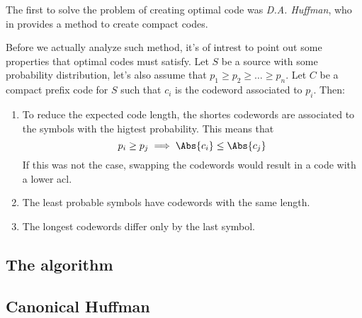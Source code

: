 \documentclass{subfiles}
\begin{document}
\label{Sec:2}
    The first to solve the problem of creating optimal code was \emph{D.A. Huffman},
       who in \cite{huffman1952} provides a method to create compact codes.

        Before we actually analyze such method, 
            it's of intrest to point out some properties that optimal codes 
            must satisfy.
        Let \(S\) be a source with some probability distribution,
        let's also assume that \(p_{1} \ge p_{2} \ge \ldots \ge p_{n}\).
        Let \(C\) be a compact prefix code for \(S\) such that \(c_{i}\) is 
            the codeword associated to \(p_{i}\). Then:
        \begin{enumerate}
            \item To reduce the expected code length, 
                the shortes codewords are associated to the symbols with the higtest
                probability. This means that 
                \[
                   p_{i} \ge p_{j} \implies \Abs{c_{i}} \le \Abs{c_{j}}
                \]
                If this was not the case, 
                swapping the codewords would result in a code with a lower \gls{acl}.

            \item The least probable symbols have codewords with the same length.
            \item The longest codewords differ only by the last symbol.
        \end{enumerate}

        \subsection{The algorithm}
        

        \subsection{Canonical Huffman}
        
\end{document}

